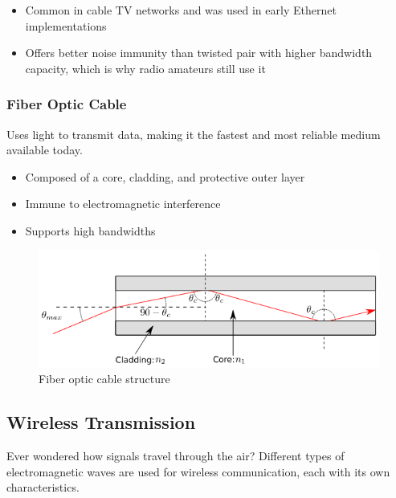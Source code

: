 \begin{itemize}
    \item Common in cable TV networks and was used in early Ethernet implementations
    \item Offers better noise immunity than twisted pair with higher bandwidth capacity, which is why radio amateurs still use it
\end{itemize}

\vspace{1em}

\newpage
\subsubsection*{Fiber Optic Cable}
Uses light to transmit data, making it the fastest and most reliable medium available today.

\begin{itemize}
    \item Composed of a core, cladding, and protective outer layer
    \item Immune to electromagnetic interference
    \item Supports high bandwidths
\end{itemize}

\begin{figure}
    \centering
    \includegraphics[width=.8\textwidth]{assets/osi/physical/fiber.png}
    \caption{Fiber optic cable structure}\label{fig:fiber_optic}
\end{figure}

\vspace{1em}

\subsection*{Wireless Transmission}
Ever wondered how signals travel through the air? Different types of electromagnetic waves are used for wireless communication, each with its own characteristics.

